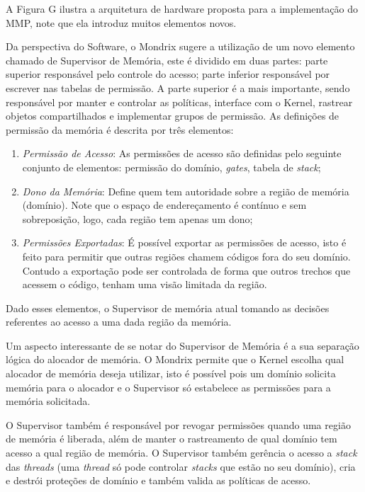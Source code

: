 A Figura G ilustra a arquitetura de hardware proposta para a implementação do
MMP, note que ela introduz muitos elementos novos. %

Da perspectiva do Software, o Mondrix \citep{mondrix} sugere a utilização de um
novo elemento chamado de Supervisor de Memória, este é dividido em duas partes:
parte superior responsável pelo controle do acesso; parte inferior responsável
por escrever nas tabelas de permissão. A parte superior é a mais importante,
sendo responsável por manter e controlar as políticas, interface com o Kernel,
rastrear objetos compartilhados e implementar grupos de permissão. As
definições de permissão da memória é descrita por três elementos:

\begin{enumerate}
	\item \emph{Permissão de Acesso}: As permissões de acesso são definidas pelo
				seguinte conjunto de elementos: permissão do domínio, \emph{gates},
        tabela de \emph{stack};
	\item \emph{Dono da Memória}: Define quem tem autoridade sobre a região de
				memória (domínio). Note que o espaço de endereçamento é contínuo e sem
				sobreposição, logo, cada região tem apenas um dono;
	\item \emph{Permissões Exportadas}: É possível exportar as permissões de
				acesso, isto é feito para permitir que outras regiões chamem códigos
				fora do seu domínio. Contudo a exportação pode ser controlada de forma
				que outros trechos que acessem o código, tenham uma visão limitada da
				região.
\end{enumerate}

Dado esses elementos, o Supervisor de memória atual tomando as decisões
referentes ao acesso a uma dada região da memória.

Um aspecto interessante de se notar do Supervisor de Memória é a sua separação
lógica do alocador de memória. O Mondrix permite que o Kernel escolha qual
alocador de memória deseja utilizar, isto é possível pois um domínio solicita
memória para o alocador e o Supervisor só estabelece as permissões para a
memória solicitada.

O Supervisor também é responsável por revogar permissões quando uma região de
memória é liberada, além de manter o rastreamento de qual domínio tem acesso a
qual região de memória. O Supervisor também gerência o acesso a \emph{stack}
das \emph{threads} (uma \emph{thread} só pode controlar \emph{stacks} que estão
no seu domínio), cria e destrói proteções de domínio e também valida as
políticas de acesso.

